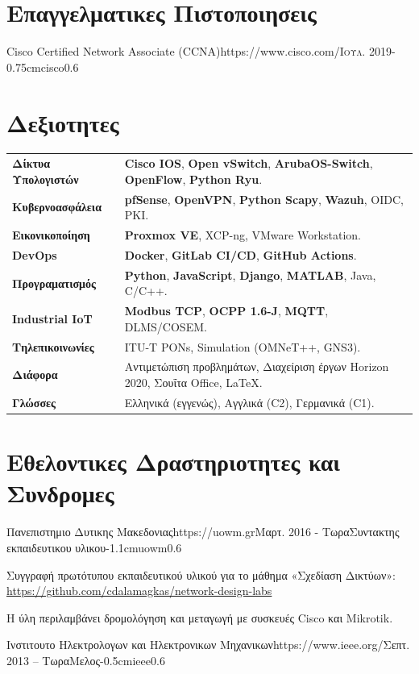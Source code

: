 \documentclass{mycv}
\begin{document}
	\section{Επαγγελματικες Πιστοποιησεις}
	\begin{EntryDatedLogo}{Cisco Certified Network Associate (CCNA)}{https://www.cisco.com/}{\scshape{Ιουλ. 2019}}{}{-0.75cm}{cisco}{0.6}
	\end{EntryDatedLogo}
	\vspace{0.25cm}
	
	\section{Δεξιοτητες}
	\begin{tabular}{m{4.5cm} m{13cm}}\renewcommand{\arraystretch}{2}
		\textbf{Δίκτυα Υπολογιστών}   	& \textbf{Cisco IOS}, \textbf{Open vSwitch}, \textbf{ArubaOS-Switch}, \textbf{OpenFlow}, \textbf{Python Ryu}.\\
		\textbf{Κυβερνοασφάλεια}		& \textbf{pfSense}, \textbf{OpenVPN}, \textbf{Python Scapy}, \textbf{Wazuh}, OIDC, PKI.\\
		\textbf{Εικονικοποίηση}			& \textbf{Proxmox VE}, XCP-ng, VMware Workstation.\\ 
		\textbf{DevOps}					& \textbf{Docker}, \textbf{GitLab CI/CD}, \textbf{GitHub Actions}. \\
		\textbf{Προγραματισμός}	    	& \textbf{Python}, \textbf{JavaScript}, \textbf{Django}, \textbf{MATLAB}, Java, C/C++. \\
		\textbf{Industrial IoT}			& \textbf{Modbus TCP}, \textbf{OCPP 1.6-J}, \textbf{MQTT}, DLMS/COSEM.\\
		\textbf{Τηλεπικοινωνίες}   		& ITU-T PONs, Simulation (OMNeT++, GNS3). \\
		\textbf{Διάφορα}				& Αντιμετώπιση προβλημάτων, Διαχείριση έργων Horizon 2020, Σουΐτα Office, \LaTeX. \\
		\textbf{Γλώσσες} 				& Ελληνικά (εγγενώς), Αγγλικά (C2), Γερμανικά (C1).
	\end{tabular}

	\section{Εθελοντικες Δραστηριοτητες και Συνδρομες}
	\vspace*{0.125cm}	
	\begin{EntryDatedLogo}{Πανεπιστημιο Δυτικης Μακεδονιας}{https://uowm.gr}{Μαρτ. 2016 - Τωρα}{Συντακτης εκπαιδευτικου υλικου}{-1.1cm}{uowm}{0.6}
		\begin{Itemize}
			\item Συγγραφή πρωτότυπου εκπαιδευτικού υλικού για το μάθημα «Σχεδίαση Δικτύων»: \url{https://github.com/cdalamagkas/network-design-labs}
			\item Η ύλη περιλαμβάνει δρομολόγηση και μεταγωγή με συσκευές Cisco και Mikrotik.
		\end{Itemize}
	\end{EntryDatedLogo}
	
	\vspace*{0.5cm}
	
	\begin{EntryDatedLogo}{Ινστιτουτο Ηλεκτρολογων και Ηλεκτρονικων Μηχανικων}{https://www.ieee.org/}{Σεπτ. 2013 -- Τωρα}{Μελος}{-0.5cm}{ieee}{0.6}
	\end{EntryDatedLogo}
	
	
\end{document}
